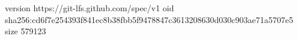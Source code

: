 version https://git-lfs.github.com/spec/v1
oid sha256:cd6f7e254393f841ec8b38fbb5f9478847c3613208630d030c903ae71a5707e5
size 579123
